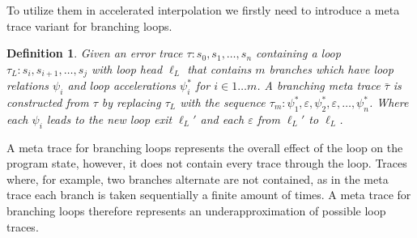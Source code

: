 \documentclass{article}
\newcommand{\loc}[1]{\ensuremath{\ell_{#1}}}
\newcounter{example}[section]
\newtheorem{mydef}{Definition}
\newcommand\mycom[1]{}
\newcommand\mycom[1]{#1}
\newcommand{\ts}[1]{\mycom{\todo[color=green!40,inline]{\small TS: #1}}}
\begin{document}
To utilize them in accelerated interpolation we firstly need to introduce a meta trace variant for branching loops.

\begin{mydef}
	Given an error trace $\tau: s_0, s_1, \ldots, s_n$ containing a loop $\tau_L: s_i, s_{i+1}, \ldots, s_j$ with loop head $\loc{L}$ that contains $m$ branches which have loop relations $\psi_i$ and loop accelerations $\psi_i^*$ for $i \in 1 \ldots m$.\ts{use a different index, $i$ is the loophead index} A branching meta trace $\bar{\tau}$ is constructed from $\tau$ by replacing $\tau_L$ with the sequence $\tau_m: \psi_1^*, \varepsilon, \psi_2^*, \varepsilon, \ldots, \psi_n^* $. Where each $\psi_i$ leads to the new loop exit $\loc{L}'$ and each $\varepsilon$ from $\loc{L}'$ to $\loc{L}$.
\end{mydef}
A meta trace for branching loops represents the overall effect of the loop on the program state, however, it does not contain every trace through the loop. Traces where, for example, two branches alternate are not contained, as in the meta trace each branch is taken sequentially a finite amount of times. A meta trace for branching loops therefore represents an underapproximation of possible loop traces. \\ \par
\end{document}

